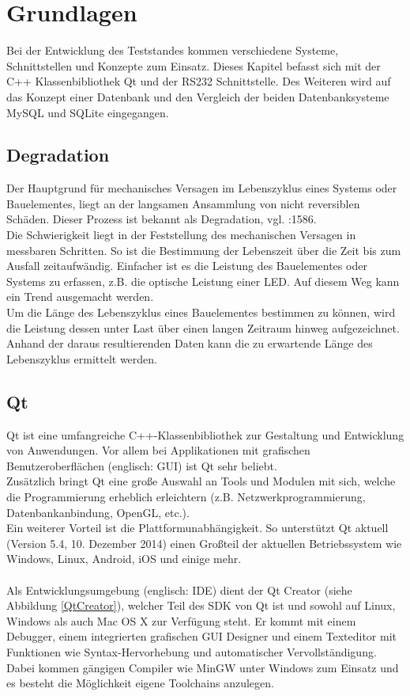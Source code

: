 \chapter{Grundlagen}
\label{chapter_Grundlagen}

Bei der Entwicklung des Teststandes kommen verschiedene Systeme, Schnittstellen und Konzepte zum Einsatz. Dieses Kapitel befasst sich mit der C++ Klassenbibliothek Qt und der RS232 Schnittstelle. Des Weiteren wird auf das Konzept einer Datenbank und den Vergleich der beiden Datenbanksysteme MySQL und SQLite eingegangen.

\section{Degradation}
Der Hauptgrund für mechanisches Versagen im Lebenszyklus eines Systems oder Bauelementes, liegt an der langsamen Ansammlung von nicht reversiblen Schäden. Dieser Prozess ist bekannt als Degradation, vgl. \cite{zhou2011}:1586.\\
Die Schwierigkeit liegt in der Feststellung des mechanischen Versagen in messbaren Schritten. So ist die Bestimmung der Lebenszeit über die Zeit bis zum Ausfall zeitaufwändig. Einfacher ist es die Leistung des Bauelementes oder Systems zu erfassen, z.B. die optische Leistung einer LED. Auf diesem Weg kann ein Trend ausgemacht werden.\\
Um die Länge des Lebenszyklus eines Bauelementes bestimmen zu können, wird die Leistung dessen unter Last über einen langen Zeitraum hinweg aufgezeichnet. Anhand der daraus resultierenden Daten kann die zu erwartende Länge des Lebenszyklus ermittelt werden.\\

 


\section{Qt}
Qt ist eine umfangreiche C++-Klassenbibliothek zur Gestaltung und Entwicklung von Anwendungen. Vor allem bei Applikationen mit grafischen Benutzeroberflächen (englisch: \ac{GUI}) ist Qt sehr beliebt. \\
Zusätzlich bringt Qt eine große Auswahl an Tools und Modulen mit sich, welche die Programmierung erheblich erleichtern (z.B. Netzwerkprogrammierung, Datenbankanbindung, OpenGL, etc.). \\
Ein weiterer Vorteil ist die Plattformunabhängigkeit. So unterstützt Qt aktuell (Version 5.4, 10. Dezember 2014) einen Großteil der aktuellen Betriebssystem wie Windows, Linux, Android, iOS und einige mehr.
\\\\
Als Entwicklungsumgebung (englisch: \ac{IDE}) dient der Qt Creator (siehe Abbildung \ref{QtCreator}), welcher Teil des \ac{SDK} von Qt ist und sowohl auf Linux, Windows als auch Mac OS X zur Verfügung steht. Er kommt mit einem Debugger, einem integrierten grafischen \ac{GUI} Designer und einem Texteditor mit Funktionen wie Syntax-Hervorhebung und automatischer Vervollständigung. \\
Dabei kommen gängigen Compiler wie MinGW unter Windows zum Einsatz und es besteht die Möglichkeit eigene Toolchains anzulegen. \\

